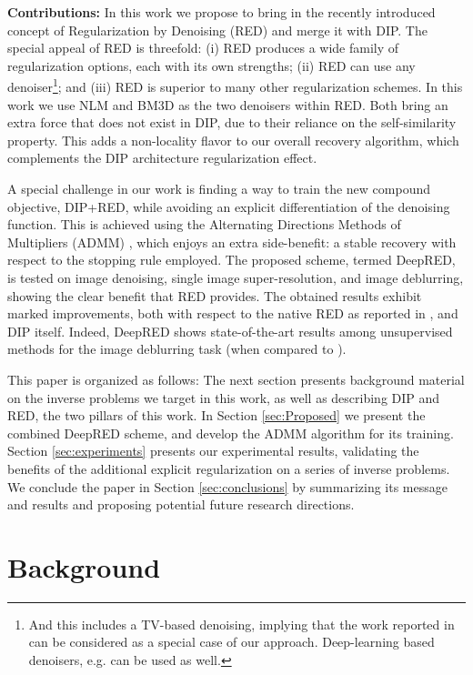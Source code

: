 \documentclass[12pt]{article}
\begin{document}
{\bf Contributions: }In this work we propose to bring in the recently introduced concept of Regularization by Denoising (RED) \cite{RED-2017} and merge it with DIP. The special appeal of RED is threefold:  (i) RED produces a wide family of regularization options, each with its own strengths; (ii)  RED can use any denoiser\footnote{And this includes a TV-based denoising, implying that the work reported in \cite{DIP-TV} can be considered as a special case of our approach. Deep-learning based denoisers, e.g. \cite{DL1, DL2, DL3, DL4} can be used as well.}; and (iii) RED is superior to many other regularization schemes. In this work we use NLM \cite{NLM} and BM3D \cite{BM3D} as the two denoisers within RED. Both bring an extra force that does not exist in DIP, due to their reliance on the self-similarity property. This adds a non-locality flavor to our overall recovery algorithm, which complements the DIP architecture regularization effect.

A special challenge in our work is finding a way to train the new compound objective, DIP+RED, while avoiding an explicit differentiation of the denoising function. This is achieved using the Alternating Directions Methods of Multipliers (ADMM) \cite{ADMM}, which enjoys an extra side-benefit: a stable recovery with respect to the stopping rule employed. The proposed scheme, termed DeepRED, is tested on image denoising, single image super-resolution, and image deblurring, showing the clear benefit that RED provides. The obtained results exhibit marked improvements, both with respect to the native RED as reported in \cite{RED-2017}, and DIP itself. Indeed, DeepRED shows state-of-the-art results among unsupervised methods for the image deblurring task (when compared to \cite{multi}).

This paper is organized as follows: The next section presents background material on the inverse problems we target in this work, as well as describing DIP and RED, the two pillars of this work. In Section \ref{sec:Proposed} we present the combined DeepRED scheme, and develop the ADMM algorithm for its training. Section \ref{sec:experiments} presents our experimental results, validating the benefits of the additional explicit regularization on a series of inverse problems. We conclude the paper in Section \ref{sec:conclusions} by summarizing its message and results and proposing potential future research directions. 



\section{Background}
\label{sec:Background}
\end{document}
